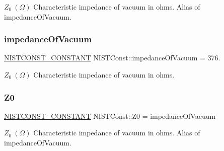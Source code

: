 $Z_0 \ (\Omega)$ Characteristic impedance of vacuum in ohms. Alias of impedance\+Of\+Vacuum. \mbox{\label{group___n_i_s_t_const-_impedance_of_vacuum_gaed60576e7b6ccd87ca6204e09efd98ee}} 
\subsubsection{\texorpdfstring{impedance\+Of\+Vacuum}{impedanceOfVacuum}}
{\footnotesize\ttfamily \mbox{\hyperlink{group___n_i_s_t_const-_macros_ga2b0fc1d7452373f816175dd86ce26729}{N\+I\+S\+T\+C\+O\+N\+S\+T\+\_\+\+C\+O\+N\+S\+T\+A\+NT}} N\+I\+S\+T\+Const\+::impedance\+Of\+Vacuum = 376.}

$Z_0 \ (\Omega)$ Characteristic impedance of vacuum in ohms. \mbox{\label{group___n_i_s_t_const-_impedance_of_vacuum_ga6015120b458e0758f594ead095f54939}} 
\subsubsection{\texorpdfstring{Z0}{Z0}}
{\footnotesize\ttfamily \mbox{\hyperlink{group___n_i_s_t_const-_macros_ga2b0fc1d7452373f816175dd86ce26729}{N\+I\+S\+T\+C\+O\+N\+S\+T\+\_\+\+C\+O\+N\+S\+T\+A\+NT}} N\+I\+S\+T\+Const\+::\+Z0 = impedance\+Of\+Vacuum}

$Z_0 \ (\Omega)$ Characteristic impedance of vacuum in ohms. Alias of impedance\+Of\+Vacuum. 